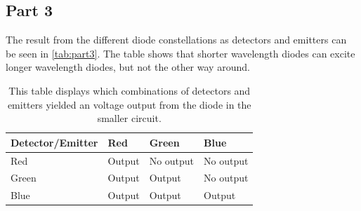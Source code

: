 \subsection{Part 3}
The result from the different diode constellations as detectors and emitters can be seen in \autoref{tab:part3}. The table shows that shorter wavelength diodes can excite longer wavelength diodes, but not the other way around.

\begin{table}[H]
    \centering
    \caption{This table displays which combinations of detectors and emitters yielded an voltage output from the diode in the smaller circuit.}
    \begin{tabular}{@{}llll@{}}
    \toprule
    Detector/Emitter & Red    & Green     & Blue      \\ \midrule
    Red              & Output & No output & No output \\
    Green            & Output & Output    & No output \\
    Blue             & Output & Output    & Output    \\ \bottomrule
    \end{tabular}
    \label{tab:part3}
\end{table}